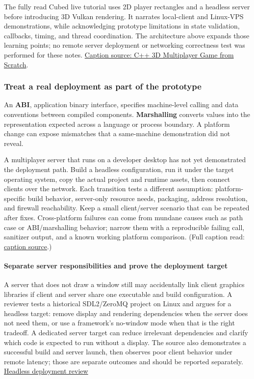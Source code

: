 The fully read Cubed live tutorial uses 2D player rectangles and a headless server before introducing 3D Vulkan rendering. It narrates local-client and Linux-VPS demonstrations, while acknowledging prototype limitations in state validation, callbacks, timing, and thread coordination. The architecture above expands those learning points; no remote server deployment or networking correctness test was performed for these notes. \href{https://www.youtube.com/watch?v=W1MSxy90BLg}{Caption source: C++ 3D Multiplayer Game from Scratch}.

\subsubsection{Treat a real deployment as part of the prototype}\label{06-engine-ii-ch040-treat-a-real-deployment-as-part-of-the-prototype}

An \textbf{ABI}, application binary interface, specifies machine-level calling and data conventions between compiled components. \textbf{Marshalling} converts values into the representation expected across a language or process boundary. A platform change can expose mismatches that a same-machine demonstration did not reveal.

A multiplayer server that runs on a developer desktop has not yet demonstrated the deployment path. Build a headless configuration, run it under the target operating system, copy the actual project and runtime assets, then connect clients over the network. Each transition tests a different assumption: platform-specific build behavior, server-only resource needs, packaging, address resolution, and firewall reachability. Keep a small client/server scenario that can be repeated after fixes. Cross-platform failures can come from mundane causes such as path case or ABI/marshalling behavior; narrow them with a reproducible failing call, sanitizer output, and a known working platform comparison. (Full caption read: \href{https://www.youtube.com/watch?v=hDCnTTyxLl8}{caption source}.)

\paragraph{Separate server responsibilities and prove the deployment target}\label{06-engine-ii-ch040-separate-server-responsibilities-and-prove-the-deployment-target}

A server that does not draw a window still may accidentally link client graphics libraries if client and server share one executable and build configuration. A reviewer tests a historical SDL2/ZeroMQ project on Linux and argues for a headless target: remove display and rendering dependencies when the server does not need them, or use a framework's no-window mode when that is the right tradeoff. A dedicated server target can reduce irrelevant dependencies and clarify which code is expected to run without a display. The source also demonstrates a successful build and server launch, then observes poor client behavior under remote latency; those are separate outcomes and should be reported separately. \href{https://www.youtube.com/watch?v=lAXOmE481j4&t=5m33s}{Headless deployment review}

